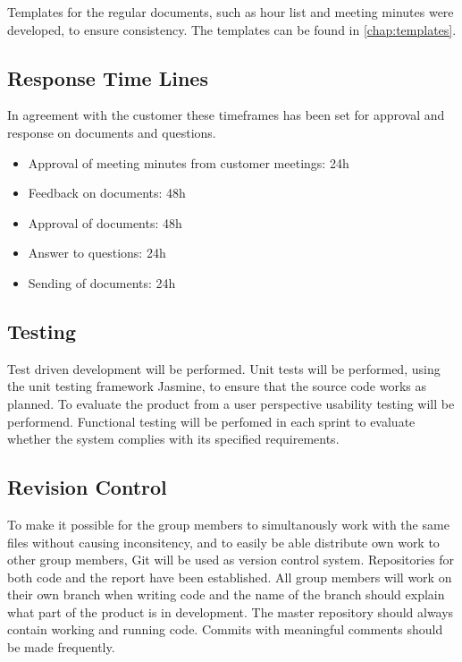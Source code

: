 Templates for the regular documents, such as hour list and meeting minutes were developed, to ensure consistency. The templates can be found in \ref{chap:templates}.

\subsection{Response Time Lines}

In agreement with the customer these timeframes has been set for approval and response on documents and questions.

\begin{itemize}
	\item Approval of meeting minutes from customer meetings: 24h
	\item Feedback on documents: 48h
	\item Approval of documents: 48h
	\item Answer to questions: 24h
	\item Sending of documents: 24h
\end{itemize}

\subsection{Testing}

Test driven development will be performed. Unit tests will be performed, using the unit testing framework Jasmine, to ensure that the source code works as planned. To evaluate the product from a user perspective usability testing will be performend. Functional testing will be perfomed in each sprint to evaluate whether the system complies with its specified requirements.

\subsection{Revision Control}

To make it possible for the group members to simultanously work with the same files without causing inconsitency, and to easily be able distribute own work to other group members, Git will be used as version control system. Repositories for both code and the report have been established. All group members will work on their own branch when writing code and the name of the branch should explain what part of the product is in development. The master repository should always contain working and running code. Commits with meaningful comments should be made frequently.

